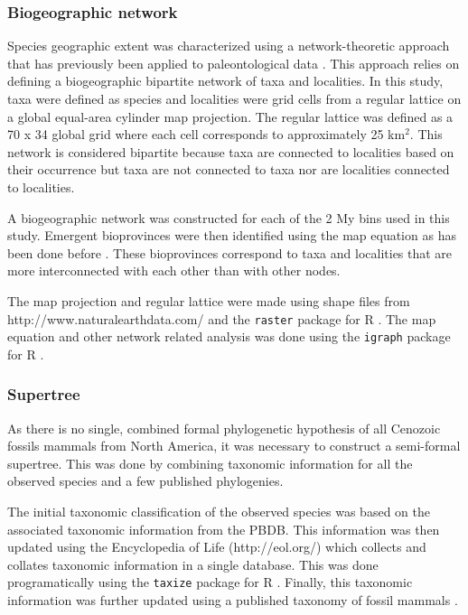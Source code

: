 \documentclass{article}
\begin{document}
\subsubsection{Biogeographic network}
Species geographic extent was characterized using a network-theoretic approach that has previously been applied to paleontological data \cite{Sidor2013,Vilhena2013}. This approach relies on defining a biogeographic bipartite network of taxa and localities. In this study, taxa were defined as species and localities were grid cells from a regular lattice on a global equal-area cylinder map projection. The regular lattice was defined as a 70 x 34 global grid where each cell corresponds to approximately 25 km\(^{2}\). This network is considered bipartite because taxa are connected to localities based on their occurrence but taxa are not connected to taxa nor are localities connected to localities.

A biogeographic network was constructed for each of the 2 My bins used in this study. Emergent bioprovinces were then identified using the map equation \cite{Rosvall2008,Rosvall2009a} as has been done before \cite{Sidor2013,Vilhena2013b,Vilhena2013}. These bioprovinces correspond to taxa and localities that are more interconnected with each other than with other nodes.

The map projection and regular lattice were made using shape files from http://www.naturalearthdata.com/ and the \texttt{raster} package for R \cite{raster}. The map equation and other network related analysis was done using the \texttt{igraph} package for R \cite{csardi2006igraph}.


\subsubsection{Supertree}

As there is no single, combined formal phylogenetic hypothesis of all Cenozoic fossils mammals from North America, it was necessary to construct a semi-formal supertree. This was done by combining taxonomic information for all the observed species and a few published phylogenies.

The initial taxonomic classification of the observed species was based on the associated taxonomic information from the PBDB. This information was then updated using the Encyclopedia of Life (http://eol.org/) which collects and collates taxonomic information in a single database. This was done programatically using the \texttt{taxize} package for R \cite{2013taxize}. Finally, this taxonomic information was further updated using a published taxonomy of fossil mammals \cite{Janis2008,Janis1998}. 
\end{document}
